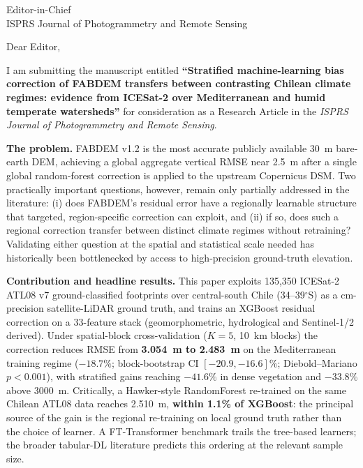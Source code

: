 \documentclass[11pt]{letter}
\begin{document}
\begin{letter}{Editor-in-Chief\\ISPRS Journal of Photogrammetry and Remote Sensing}

\opening{Dear Editor,}

I am submitting the manuscript entitled \textbf{``Stratified machine-learning bias correction of FABDEM transfers between contrasting Chilean climate regimes: evidence from ICESat-2 over Mediterranean and humid temperate watersheds''} for consideration as a Research Article in the \textit{ISPRS Journal of Photogrammetry and Remote Sensing}.

\textbf{The problem.} FABDEM v1.2 is the most accurate publicly available 30~m bare-earth DEM, achieving a global aggregate vertical RMSE near 2.5~m after a single global random-forest correction is applied to the upstream Copernicus DSM. Two practically important questions, however, remain only partially addressed in the literature: (i) does FABDEM's residual error have a regionally learnable structure that targeted, region-specific correction can exploit, and (ii) if so, does such a regional correction transfer between distinct climate regimes without retraining? Validating either question at the spatial and statistical scale needed has historically been bottlenecked by access to high-precision ground-truth elevation.

\textbf{Contribution and headline results.} This paper exploits 135{,}350 ICESat-2 ATL08 v7 ground-classified footprints over central-south Chile (34--39$^{\circ}$S) as a cm-precision satellite-LiDAR ground truth, and trains an XGBoost residual correction on a 33-feature stack (geomorphometric, hydrological and Sentinel-1/2 derived). Under spatial-block cross-validation ($K=5$, 10~km blocks) the correction reduces RMSE from \textbf{3.054~m to 2.483~m} on the Mediterranean training regime ($-18.7\%$; block-bootstrap CI $[-20.9, -16.6]\%$; Diebold--Mariano $p<0.001$), with stratified gains reaching $-41.6\%$ in dense vegetation and $-33.8\%$ above 3000~m. Critically, a Hawker-style RandomForest re-trained on the same Chilean ATL08 data reaches 2.510~m, \textbf{within 1.1\% of XGBoost}: the principal source of the gain is the regional re-training on local ground truth rather than the choice of learner. A FT-Transformer benchmark trails the tree-based learners; the broader tabular-DL literature predicts this ordering at the relevant sample size.


\end{letter}
\end{document}

